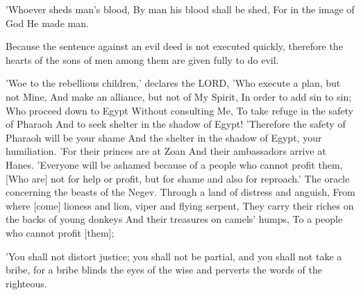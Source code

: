 \begin{scripture}[Genesis 9:6]
    'Whoever sheds man's blood, By man his blood shall be shed, For in the image of God He made man.
\end{scripture}

\begin{scripture}[Ecclesiastes 8:11]
    Because the sentence against an evil deed is not executed quickly, therefore the hearts of the sons of men among them are given fully to do evil.
\end{scripture}

\begin{scripture}[Isaiah 30:1-6]
    'Woe to the rebellious children,' declares the LORD, 'Who execute a plan, but not Mine, And make an alliance, but not of My Spirit, In order to add sin to sin;
    Who proceed down to Egypt Without consulting Me, To take refuge in the safety of Pharaoh And to seek shelter in the shadow of Egypt!
    'Therefore the safety of Pharaoh will be your shame And the shelter in the shadow of Egypt, your humiliation.
    'For their princes are at Zoan And their ambassadors arrive at Hanes.
    'Everyone will be ashamed because of a people who cannot profit them, [Who are] not for help or profit, but for shame and also for reproach.'
    The oracle concerning the beasts of the Negev. Through a land of distress and anguish, From where [come] lioness and lion, viper and flying serpent, They carry their riches on the backs of young donkeys And their treasures on camels' humps, To a people who cannot profit [them];
\end{scripture}

\begin{scripture}[Deuteronomy 16:19]
    'You shall not distort justice; you shall not be partial, and you shall not take a bribe, for a bribe blinds the eyes of the wise and perverts the words of the righteous.
\end{scripture}

